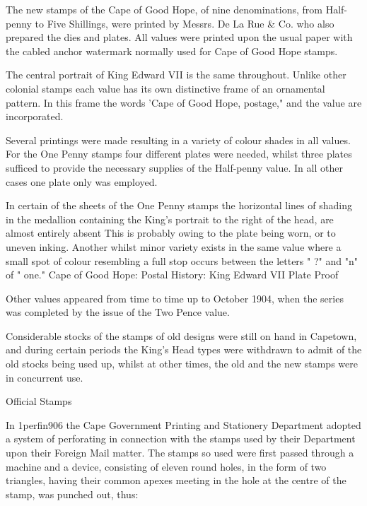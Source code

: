 The new stamps of the Cape of Good Hope, of nine denominations, from Half-penny to Five Shillings, were printed by Messrs. De La Rue \& Co. who also prepared the dies and plates. All values were printed upon the usual paper with the cabled anchor watermark normally used for Cape of Good Hope stamps.


						

The central portrait of King Edward VII is the same throughout. 
Unlike other colonial stamps each value has its own distinctive 
frame of an ornamental pattern. In this frame the words 'Cape of 
Good Hope, postage," and the value are incorporated.

Several printings were made resulting in a variety of colour 
shades in all values.
For the One Penny stamps four different plates were needed, 
whilst three plates sufficed to provide the necessary supplies 
of the Half-penny value. In all other cases one plate only was employed.
 

In certain of the sheets of the One Penny stamps the horizontal 
lines of shading in the medallion containing the King's portrait to 
the right of the head, are almost entirely absent This is probably 
owing to the plate being worn, or to uneven inking. Another whilst 
minor variety exists in the same value where a small spot of colour 
resembling a full stop occurs between the letters " ?" and "n" of " one."
Cape of Good Hope: Postal History: King Edward VII Plate Proof
 

Other values appeared from time to time up to October 1904, when the series was completed by the issue of the Two Pence value.


Considerable stocks of the stamps of old designs were still on hand in Capetown, and during certain periods the King's Head types were withdrawn to admit of the old stocks being used up, whilst at other times, the old and the new stamps were in concurrent use.
 
 
Official Stamps

In 1perfin906 the Cape Government Printing and Stationery Department adopted a system of perforating in connection with the stamps used by their Department upon their Foreign Mail matter. The stamps so used were first passed through a machine and a device, consisting of eleven round holes, in the form of two triangles, having their common apexes meeting in the hole at the centre of the stamp, was punched out, thus:

